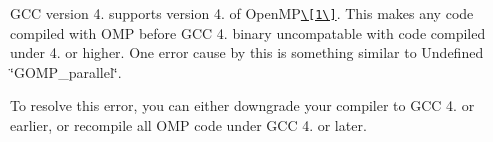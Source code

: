 G\+C\+C version 4. supports version 4. of Open\+M\+P\href{https://software.intel.com/en-us/articles/gcc-49-openmp-code-cannot-be-linked-with-intel-openmp-runtime}{\tt \textbackslash{}\mbox{[}1\textbackslash{}\mbox{]}}. This makes any code compiled with O\+M\+P before G\+C\+C 4. binary uncompatable with code compiled under 4. or higher. One error cause by this is something similar to {\ttfamily Undefined \char`\"{}\+G\+O\+M\+P\+\_\+parallel\char`\"{}}.

To resolve this error, you can either downgrade your compiler to G\+C\+C 4. or earlier, or recompile all O\+M\+P code under G\+C\+C 4. or later. 